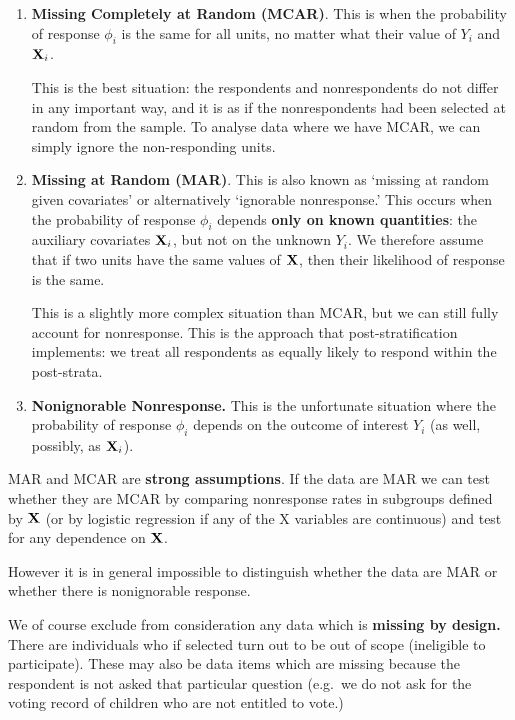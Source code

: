 \documentclass[
]{book}
\begin{document}
\begin{enumerate}
\def\labelenumi{\arabic{enumi}.}
\item
  \textbf{Missing Completely at Random (MCAR)}. This is when the probability of
  response \(\phi_i\) is the same for all units, no matter what their value of
  \(Y_i\) and \({\bf X}_i\).

  This is the best situation: the respondents and nonrespondents do not
  differ in any important way, and it is as if the nonrespondents had been
  selected at random from the sample. To analyse data where we have MCAR,
  we can simply ignore the non-responding units.
\item
  \textbf{Missing at Random (MAR)}. This is also known as `missing at random given
  covariates' or alternatively `ignorable nonresponse.' This occurs when
  the probability of response \(\phi_i\) depends \textbf{only on known quantities}:
  the auxiliary covariates \({\bf X}_i\), but not on the unknown \(Y_i\).
  We therefore assume that if two units have the same values of \({\bf X}\), then their
  likelihood of response is the same.

  This is a slightly more complex situation than MCAR, but we can still
  fully account for nonresponse. This is the approach that post-stratification
  implements: we treat all respondents as equally likely to respond within
  the post-strata.
\item
  \textbf{Nonignorable Nonresponse.} This is the unfortunate situation where the
  probability of response \(\phi_i\) depends on the outcome of interest \(Y_i\)
  (as well, possibly, as \({\bf X}_i\)).
\end{enumerate}

MAR and MCAR are \textbf{strong assumptions}. If the data are MAR we can test whether
they are MCAR by comparing nonresponse rates in subgroups defined by \({\bf X}\) (or by
logistic regression if any of the X variables are continuous) and test for
any dependence on \({\bf X}\).

However it is in general impossible to distinguish whether the data are MAR or
whether there is nonignorable response.

We of course exclude from consideration any data which is \textbf{missing by design.}
There are individuals who if selected turn out to be out of scope (ineligible to
participate). These may also be data items which are missing because the respondent
is not asked that particular question (e.g.~we do not ask for the voting
record of children who are not entitled to vote.)
\end{document}
